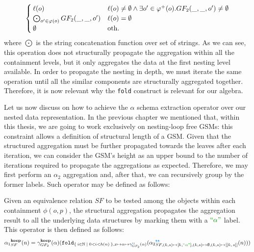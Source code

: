 \begin{example}[continues=ex:aggregations,label=ex:aggregations2]
\[\begin{cases}
\ell(o) & \ell(o)\neq\emptyset \wedge \exists o'\in\varphi^+(o). GF_2(\_,\_,o')\neq\emptyset \\
\bigodot_{o'\in\varphi(o)}GF_2(\_,\_,o') & \ell(o)=\emptyset\\
\emptyset & \textup{oth.}\\
\end{cases}\]
where $\bigodot$ is the string concatenation function over set of strings.
As we can see, this operation does not structurally propagate the aggregation within all the containment levels, but it only aggregates the data at the first nesting level available. In order to propagate the nesting in depth, we must iterate the same operation until all the similar components are structurally aggregated together. Therefore, it is now relevant why the \texttt{fold} construct is relevant for our algebra.
\end{example}


\label{abstractionAlpha1}

Let us now discuss on how to achieve the $\alpha$ schema extraction operator over our nested data representation. In the previous chapter we mentioned that, within this thesis, we are going to work exclusively on nesting-loop free GSMs: this constraint allows a definition of structural length of a GSM. Given that the structured aggregation must be further propagated towards the leaves after each iteration, we can consider the GSM's height as an upper bound to the number of iterations required to propagate the aggregations as expected. Therefore, we may first perform an $\alpha_2$ aggregation and, after that, we can recursively group by the former labels. Such operator may be defined as follows:



\begin{definition}
	Given an equivalence relation $SF$ to be tested among the objects within each containment $\phi(o,p)$, the structural aggregation propagates the aggregation result to all the underlying data structures by marking them with a $\hstr{\alpha}$ label. This operator is then defined as follows:
	\[{\alpha_1}_{SF}^{\textbf{keep}}(n)=\gamma_{GF_2}^{\textbf{keep}}(\alpha)(\texttt{fold}_{\Set{i\in \nat|0<i< h(n)},x\mapsto\alpha\mapsto \gamma_{GF_2}^{{\color{RoyalBlue}\texttt{tt}}}(\alpha)}({\alpha_2}_{SF,(k,s)\mapsto [k,\hstr{\alpha}], (k,s)\mapsto \emptyset, (k,s)\mapsto[[k,\, s]]}^{{\color{RoyalBlue}\texttt{tt}}}(n)))\]
\end{definition}

